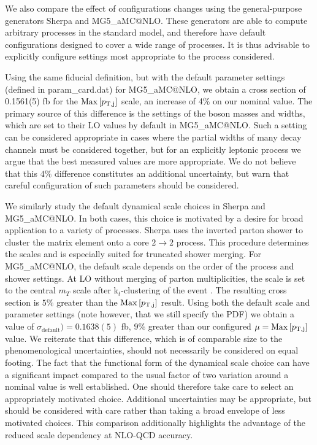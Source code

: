\documentclass[11pt]{cernrep}
\makeatletter
\newcommand{\MGaMC}{M\protect\scalebox{0.8}{AD}G\protect\scalebox{0.8}{RAPH}5\_aMC@NLO\xspace}
\newcommand{\MP}[1]{{ {\color{blue}{ [MP: #1]}} }}
\makeatother
\begin{document}
We also compare the effect of configurations changes using the general-purpose generators {\sc Sherpa} and \MGaMC. 
These generators are able to compute arbitrary processes in the standard model, 
and therefore have default configurations designed to cover a wide range of processes. It is thus advisable
to explicitly configure settings most appropriate to the process considered. 

Using the same fiducial definition, but with the default parameter settings (defined in param\_card.dat) for 
\MGaMC, we obtain a cross section of 0.1561(5) fb for the ${\rm Max}\left[p_{\rm T, j}\right]$
scale, an increase of 4\% on our nominal value. The primary source of this difference is the 
settings of the boson masses and widths, which are set to their LO values by default in \MGaMC.
Such a setting can be considered appropriate in cases where the partial widths of many decay channels
must be considered together, but for an explicitly leptonic process we argue that the best measured values are
more appropriate.\MP{I don't agree with this. It is just some old default of MG and because they mostly do on-shell computations.}
We do not believe that this $4\%$ difference constitutes an additional uncertainty, but warn that
careful configuration of such parameters should be considered.

We similarly study the default dynamical scale choices in {\sc Sherpa} and \MGaMC. In both cases,
this choice is motivated by a desire for broad application to a variety of processes. Sherpa uses the inverted
parton shower to cluster the matrix element onto a core $2 \to 2$ process. This procedure determines the scales
and is especially suited for truncated shower merging. For \MGaMC,
the default scale depends on the order of the process and shower settings. At LO without
merging of parton multiplicities, the scale is set to the central $m_{T}$ scale after k$_t$-clustering of the event \MP{Should it not be anti-kt?}.
The resulting cross section is $5\%$ greater than the ${\rm Max}\left[p_{\rm T, j}\right]$ result.
Using both the default scale and parameter settings (note however, that we still specify the PDF)
we obtain a value of $\sigma_{\mathrm{default}}) = 0.1638(5)$ fb, $9\%$ greater than our configured
$\mu = {\rm Max}\left[p_{\rm T, j}\right]$ value. We reiterate that this difference, which is
of comparable size to the phenomenological uncertainties, should not necessarily be considered on equal footing.
The fact that the functional form of the dynamical scale choice can have a significant impact compared to the
usual factor of two variation around a nominal value is well established. One should therefore take care
to select an appropriately motivated choice. Additional uncertainties may be appropriate,
but should be considered with care rather than taking a broad envelope of less motivated choices.
This comparison additionally highlights the advantage of the reduced scale dependency at NLO-QCD accuracy.
\end{document}
